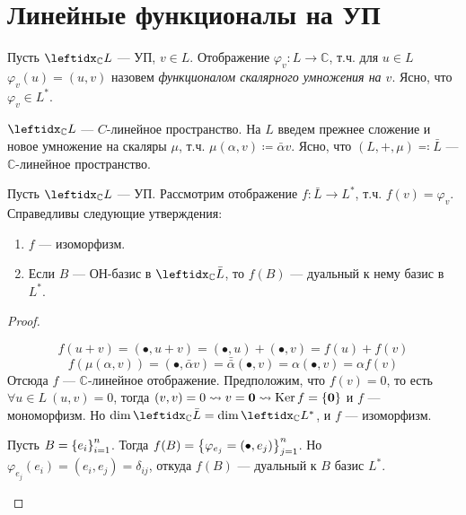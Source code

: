 \section{Линейные функционалы на УП}

\begin{defn}
    Пусть $\lsub{\mathbb{C}}{L}$ --- УП, $v \in L$. Отображение $\varphi_v \colon L \to \mathbb{C}$, т.ч. для $u \in L$ $\varphi_v(u) = (u, v)$ назовем \textit{функционалом скалярного умножения на $v$}. Ясно, что $\varphi_v \in L^*$.
\end{defn}

\begin{defn}
    $\lsub{\mathbb{C}}{L}$ --- $C$-линейное пространство. На $L$ введем прежнее сложение и новое умножение на скаляры $\mu$, т.ч. $\mu(\alpha, v) \coloneqq \bar{\alpha} v$. Ясно, что $(L, +, \mu) \eqqcolon \bar{L}$ --- $\mathbb{C}$-линейное пространство.
\end{defn}

\begin{thm*}
    Пусть $\lsub{\mathbb{C}}{L}$ --- УП. Рассмотрим отображение $f \colon \bar{L} \to L^*$, т.ч. $f(v) = \varphi_v$. Справедливы следующие утверждения:
    \begin{enumerate}
        \item $f$ --- изоморфизм.
        \item Если $B$ --- ОН-базис в $\lsub{\mathbb{C}}{\bar{L}}$, то $f(B)$ --- дуальный к нему базис в $L^*$.
    \end{enumerate}
\end{thm*}

\begin{proof}
    \begin{proofpart}
        $$f(u + v) = (\bullet, u + v) = (\bullet, u) + (\bullet, v) = f(u) + f(v)$$
        $$f(\mu(\alpha, v)) = (\bullet, \bar{\alpha}v) = \bar{\bar{\alpha}}(\bullet, v) = \alpha(\bullet, v) = \alpha f(v)$$
        Отсюда $f$ --- $\mathbb{C}$-линейное отображение. Предположим, что $f(v) = 0$, то есть $\forall u \in L\ (u, v) = 0$, тогда $(v, v) = 0 \leadsto v = \mathbf{0} \leadsto \operatorname{Ker} f = \{\mathbf{0}\}$ и $f$ --- мономорфизм. Но $\dim \lsub{\mathbb{C}}{\bar{L}} = \dim \lsub{\mathbb{C}}{L^*}$, и $f$ --- изоморфизм.
    \end{proofpart}
    \begin{proofpart}
        Пусть $B = \left\{e_i\right\}_{i=1}^{n}$. Тогда $f(B) = \left\{\varphi_{e_j} = (\bullet, e_j)\right\}_{j=1}^{n}$. Но $\varphi_{e_j}(e_i) = (e_i, e_j) = \delta_{ij}$, откуда $f(B)$ --- дуальный к $B$ базис $L^*$.
    \end{proofpart}
\end{proof}